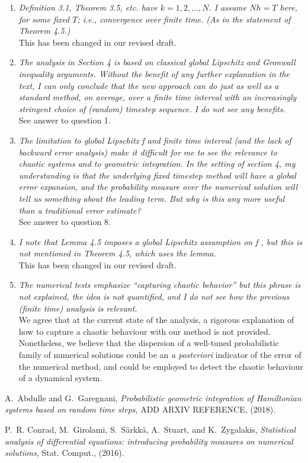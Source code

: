 \documentclass{siamart1116}
\numberwithin{theorem}{section}
\begin{document}
\begin{enumerate}[label=\arabic{*}.]
\item \textit{Definition 3.1, Theorem 3.5, etc. have $k = 1, 2, \ldots , N$. I assume $Nh = T$ here, for some fixed $T$; i.e., convergence over finite time. (As in the statement of Theorem 4.5.)} \\
This has been changed in our revised draft.
\item \textit{The analysis in Section 4 is based on classical global Lipschitz and Gronwall inequality arguments. Without the benefit of any further explanation in the text, I can only conclude that the new approach can do just as well as a standard method, on average, over a finite time interval with an increasingly stringent choice of (random) timestep sequence. I do not see any benefits.} \\
See answer to question 1.
\item \textit{The limitation to global Lipschitz f and finite time interval (and the lack of backward error analysis) make it difficult for me to see the relevance to chaotic systems and to geometric integration. In the setting of section 4, my understanding is that the underlying fixed timestep method will have a global error expansion, and the probability measure over the numerical solution will tell us something about the leading term. But why is this any more useful than a traditional error estimate?} \\
See answer to question 8.
\item \textit{I note that Lemma 4.5 imposes a global Lipschitz assumption on f , but this is not mentioned in Theorem 4.5, which uses the lemma.} \\
This has been changed in our revised draft.
\item \textit{The numerical tests emphasize “capturing chaotic behavior” but this phrase is not explained, the idea is not quantified, and I do not see how the previous (finite time) analysis is relevant.} \\
We agree that at the current state of the analysis, a rigorous explanation of how to capture a chaotic behaviour with our method is not provided. Nonetheless, we believe that the dispersion of a well-tuned probabilistic family of numerical solutions could be an \textit{a posteriori} indicator of the error of the numerical method, and could be employed to detect the chaotic behaviour of a dynamical system.
\end{enumerate}

\def\cprime{$'$}
\begin{thebibliography}{10}
	{\sc A.~Abdulle and G.~Garegnani}, {\em Probabilistic geometric integration of Hamiltonian systems based on random time steps}, ADD ARXIV REFERENCE,  (2018).
	
	{\sc P.~R. Conrad, M.~Girolami, S.~S{\"a}rkk{\"a}, A.~Stuart, and
		K.~Zygalakis}, {\em Statistical analysis of differential equations:
		introducing probability measures on numerical solutions}, Stat. Comput.,
	(2016).
\end{thebibliography}
\end{document}
